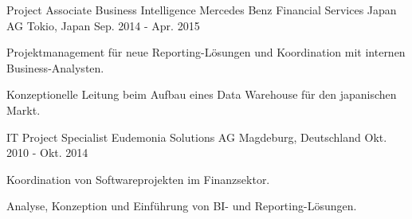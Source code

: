 \begin{cventries}
\vspace{2mm}
  \cventry
    {Project Associate Business Intelligence} %
    {Mercedes Benz Financial Services Japan AG} %
    {Tokio, Japan} %
    {Sep. 2014 - Apr. 2015} %
    {
      \begin{cvitems} %
        \item {Projektmanagement für neue Reporting-Lösungen und Koordination mit internen Business-Analysten.}
        \item {Konzeptionelle Leitung beim Aufbau eines Data Warehouse für den japanischen Markt.}
      \end{cvitems}
    }

\vspace{2mm}
\cventry
    {IT Project Specialist} %
    {Eudemonia Solutions AG} %
    {Magdeburg, Deutschland} %
    {Okt. 2010 - Okt. 2014} %
    {
      \begin{cvitems} %
        \item{Koordination von Softwareprojekten im Finanzsektor.}
        \item{Analyse, Konzeption und Einführung von BI- und Reporting-Lösungen.}
      \end{cvitems}
    }

\end{cventries}

